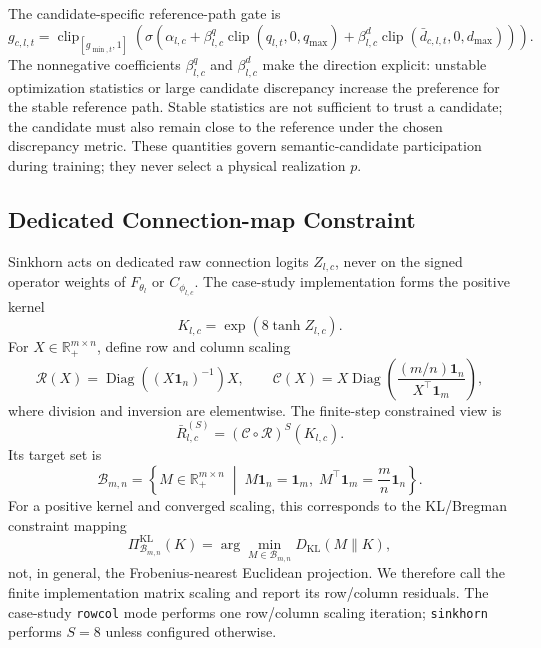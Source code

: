 \documentclass{article}
\begin{document}
The candidate-specific reference-path gate is
\begin{equation}
  g_{c,l,t}
=
\operatorname{clip}_{[g_{\min,t},1]}
\left(
\sigma\left(
  \alpha_{l,c}
+
  \beta^{q}_{l,c}\operatorname{clip}(q_{l,t},0,q_{\max})
+
  \beta^{d}_{l,c}\operatorname{clip}(\bar{d}_{c,l,t},0,d_{\max})
\right)
\right).
\label{eq:achf-gate}
\end{equation}
The nonnegative coefficients $\beta^{q}_{l,c}$ and $\beta^{d}_{l,c}$ make the
direction explicit: unstable optimization statistics or large candidate
discrepancy increase the preference for the stable reference path. Stable
statistics are not sufficient to trust a candidate; the candidate must also
remain close to the reference under the chosen discrepancy metric. These
quantities govern semantic-candidate participation during training; they never
select a physical realization $p$.

\subsection{Dedicated Connection-map Constraint}

Sinkhorn acts on dedicated raw connection logits $Z_{l,c}$, never on the signed
operator weights of $F_{\theta_l}$ or $C_{\phi_{l,c}}$. The case-study
implementation forms the positive kernel
\begin{equation}
K_{l,c}=\exp\!\left(8\tanh Z_{l,c}\right).
\label{eq:achf-positive-connection-kernel}
\end{equation}
For $X\in\mathbb{R}_{+}^{m\times n}$, define row and column scaling
\begin{equation}
\mathcal{R}(X)=
\operatorname{Diag}\!\left((X\mathbf{1}_n)^{-1}\right)X,
\qquad
\mathcal{C}(X)=
X\operatorname{Diag}\!\left(
\frac{(m/n)\mathbf{1}_n}{X^\top\mathbf{1}_m}
\right),
\label{eq:achf-sinkhorn-steps}
\end{equation}
where division and inversion are elementwise. The finite-step constrained view
is
\begin{equation}
\bar R^{(S)}_{l,c}=(\mathcal{C}\circ\mathcal{R})^S(K_{l,c}).
\label{eq:achf-projection}
\end{equation}
Its target set is
\begin{equation}
\mathcal{B}_{m,n}
=\left\{
M\in\mathbb{R}_{+}^{m\times n}
\;\middle|\;
M\mathbf{1}_n=\mathbf{1}_m,\;
M^\top\mathbf{1}_m=\frac{m}{n}\mathbf{1}_n
\right\}.
\label{eq:achf-birkhoff-rect}
\end{equation}
For a positive kernel and converged scaling, this corresponds to the
KL/Bregman constraint mapping
\begin{equation}
\Pi^{\mathrm{KL}}_{\mathcal{B}_{m,n}}(K)
=\arg\min_{M\in\mathcal{B}_{m,n}}D_{\mathrm{KL}}(M\|K),
\label{eq:achf-sinkhorn-kl-projection}
\end{equation}
not, in general, the Frobenius-nearest Euclidean projection. We therefore call
the finite implementation matrix scaling and report its row/column residuals.
The case-study \texttt{rowcol} mode performs one row/column scaling iteration;
\texttt{sinkhorn} performs $S=8$ unless configured otherwise.
\end{document}
